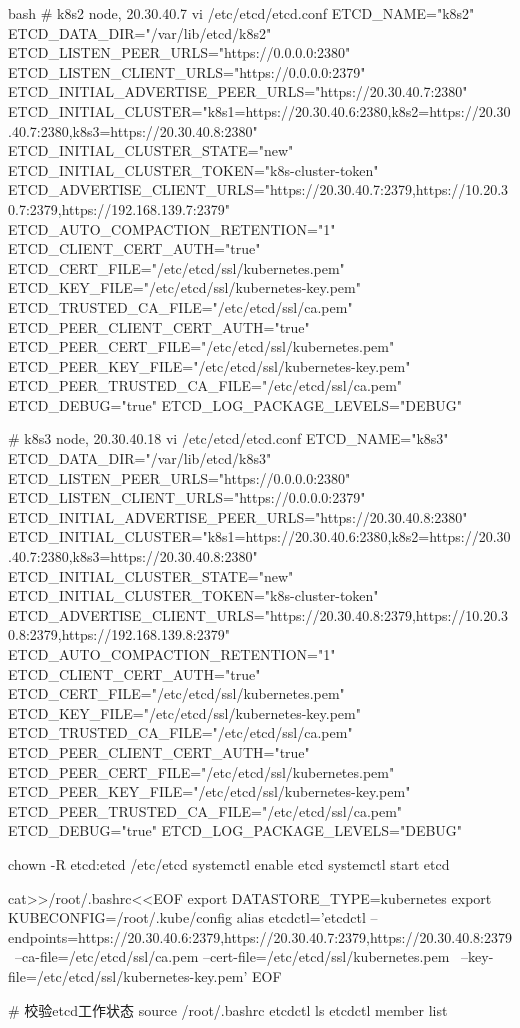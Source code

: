 \begin{outline}[enumerate]
\begin{code-in-enumerate}{bash}
# k8s2 node, 20.30.40.7
vi /etc/etcd/etcd.conf
ETCD_NAME="k8s2"
ETCD_DATA_DIR="/var/lib/etcd/k8s2"
ETCD_LISTEN_PEER_URLS="https://0.0.0.0:2380"
ETCD_LISTEN_CLIENT_URLS="https://0.0.0.0:2379"
ETCD_INITIAL_ADVERTISE_PEER_URLS="https://20.30.40.7:2380"
ETCD_INITIAL_CLUSTER="k8s1=https://20.30.40.6:2380,k8s2=https://20.30.40.7:2380,k8s3=https://20.30.40.8:2380"
ETCD_INITIAL_CLUSTER_STATE="new"
ETCD_INITIAL_CLUSTER_TOKEN="k8s-cluster-token"
ETCD_ADVERTISE_CLIENT_URLS="https://20.30.40.7:2379,https://10.20.30.7:2379,https://192.168.139.7:2379"
ETCD_AUTO_COMPACTION_RETENTION="1"
ETCD_CLIENT_CERT_AUTH="true"
ETCD_CERT_FILE="/etc/etcd/ssl/kubernetes.pem"
ETCD_KEY_FILE="/etc/etcd/ssl/kubernetes-key.pem"
ETCD_TRUSTED_CA_FILE="/etc/etcd/ssl/ca.pem"
ETCD_PEER_CLIENT_CERT_AUTH="true"
ETCD_PEER_CERT_FILE="/etc/etcd/ssl/kubernetes.pem"
ETCD_PEER_KEY_FILE="/etc/etcd/ssl/kubernetes-key.pem"
ETCD_PEER_TRUSTED_CA_FILE="/etc/etcd/ssl/ca.pem"
ETCD_DEBUG="true"
ETCD_LOG_PACKAGE_LEVELS="DEBUG"

# k8s3 node, 20.30.40.18
vi /etc/etcd/etcd.conf
ETCD_NAME="k8s3"
ETCD_DATA_DIR="/var/lib/etcd/k8s3"
ETCD_LISTEN_PEER_URLS="https://0.0.0.0:2380"
ETCD_LISTEN_CLIENT_URLS="https://0.0.0.0:2379"
ETCD_INITIAL_ADVERTISE_PEER_URLS="https://20.30.40.8:2380"
ETCD_INITIAL_CLUSTER="k8s1=https://20.30.40.6:2380,k8s2=https://20.30.40.7:2380,k8s3=https://20.30.40.8:2380"
ETCD_INITIAL_CLUSTER_STATE="new"
ETCD_INITIAL_CLUSTER_TOKEN="k8s-cluster-token"
ETCD_ADVERTISE_CLIENT_URLS="https://20.30.40.8:2379,https://10.20.30.8:2379,https://192.168.139.8:2379"
ETCD_AUTO_COMPACTION_RETENTION="1"
ETCD_CLIENT_CERT_AUTH="true"
ETCD_CERT_FILE="/etc/etcd/ssl/kubernetes.pem"
ETCD_KEY_FILE="/etc/etcd/ssl/kubernetes-key.pem"
ETCD_TRUSTED_CA_FILE="/etc/etcd/ssl/ca.pem"
ETCD_PEER_CLIENT_CERT_AUTH="true"
ETCD_PEER_CERT_FILE="/etc/etcd/ssl/kubernetes.pem"
ETCD_PEER_KEY_FILE="/etc/etcd/ssl/kubernetes-key.pem"
ETCD_PEER_TRUSTED_CA_FILE="/etc/etcd/ssl/ca.pem"
ETCD_DEBUG="true"
ETCD_LOG_PACKAGE_LEVELS="DEBUG"

chown -R etcd:etcd /etc/etcd
systemctl enable etcd
systemctl start etcd

cat>>/root/.bashrc<<EOF
export DATASTORE_TYPE=kubernetes
export KUBECONFIG=/root/.kube/config
alias etcdctl='etcdctl --endpoints=https://20.30.40.6:2379,https://20.30.40.7:2379,https://20.30.40.8:2379 \
    --ca-file=/etc/etcd/ssl/ca.pem --cert-file=/etc/etcd/ssl/kubernetes.pem  \
    --key-file=/etc/etcd/ssl/kubernetes-key.pem'
EOF

# 校验etcd工作状态
source /root/.bashrc
etcdctl ls
etcdctl member list
\end{code-in-enumerate}


\end{outline}
